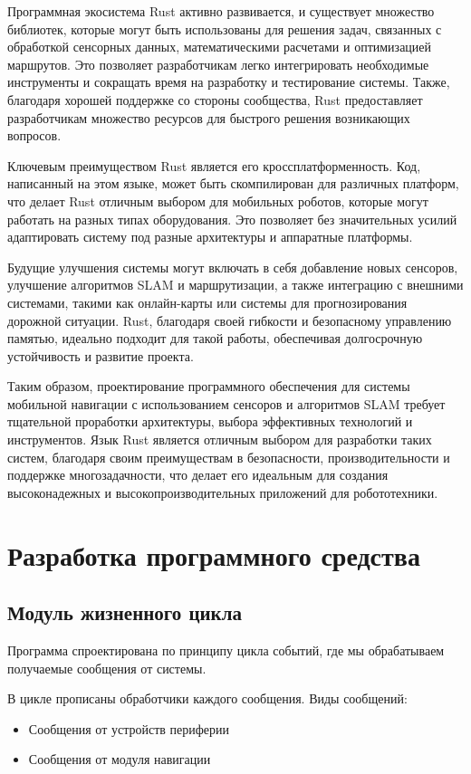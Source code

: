 Программная экосистема Rust активно развивается, и существует множество
библиотек, которые могут быть использованы для решения задач, связанных с
обработкой сенсорных данных, математическими расчетами и оптимизацией маршрутов.
Это позволяет разработчикам легко интегрировать необходимые инструменты и
сокращать время на разработку и тестирование системы. Также, благодаря хорошей
поддержке со стороны сообщества, Rust предоставляет разработчикам множество
ресурсов для быстрого решения возникающих вопросов.

Ключевым преимуществом Rust является его кроссплатформенность. Код, написанный
на этом языке, может быть скомпилирован для различных платформ, что делает Rust
отличным выбором для мобильных роботов, которые могут работать на разных типах
оборудования. Это позволяет без значительных усилий адаптировать систему под
разные архитектуры и аппаратные платформы.

Будущие улучшения системы могут включать в себя добавление новых сенсоров,
улучшение алгоритмов SLAM и маршрутизации, а также интеграцию с внешними
системами, такими как онлайн-карты или системы для прогнозирования дорожной
ситуации. Rust, благодаря своей гибкости и безопасному управлению памятью,
идеально подходит для такой работы, обеспечивая долгосрочную устойчивость и
развитие проекта.

Таким образом, проектирование программного обеспечения для системы мобильной
навигации с использованием сенсоров и алгоритмов SLAM требует тщательной
проработки архитектуры, выбора эффективных технологий и инструментов. Язык Rust
является отличным выбором для разработки таких систем, благодаря своим
преимуществам в безопасности, производительности и поддержке многозадачности,
что делает его идеальным для создания высоконадежных и высокопроизводительных
приложений для робототехники.

\section{Разработка программного средства}

\subsection{Модуль жизненного цикла}
Программа спроектирована по принципу цикла событий, где мы обрабатываем получаемые сообщения от системы.

В цикле прописаны обработчики каждого сообщения.
Виды сообщений:
\begin{itemize}
	\item Сообщения от устройств периферии
	\item Сообщения от модуля навигации
\end{itemize}

